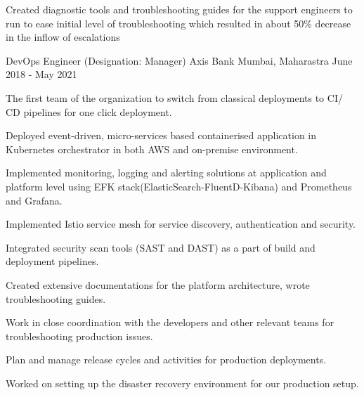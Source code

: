 \begin{cventries}
{\begin{cvitems}
  \item {Created diagnostic tools and troubleshooting guides for the support engineers to run to ease initial level of troubleshooting which resulted in about 50\% decrease in the inflow of escalations}
  \end{cvitems}
  }
  \cventry
    {DevOps Engineer (Designation: Manager)} %
    {Axis Bank} %
    {Mumbai, Maharastra} %
    {June 2018 - May 2021} %
    {
      \begin{cvitems} %
        \item {The first team of the organization to switch from classical deployments to CI/ CD pipelines for one click deployment.}
        \item {Deployed event-driven, micro-services based containerised application in Kubernetes orchestrator in both AWS and on-premise environment.}
        \item {Implemented monitoring, logging and alerting solutions at application and platform level using EFK stack(ElasticSearch-FluentD-Kibana) and Prometheus and Grafana.}
        \item {Implemented Istio service mesh for service discovery, authentication and security.}
        \item {Integrated security scan tools (SAST and DAST) as a part of build and deployment pipelines.}
        \item {Created extensive documentations for the platform architecture, wrote troubleshooting guides.}
        \item {Work in close coordination with the developers and other relevant teams for troubleshooting production issues.}
        \item {Plan and manage release cycles and activities for production deployments.}
        \item {Worked on setting up the disaster recovery environment for our production setup.}
          \end{cvitems}
    }
\end{cventries}
